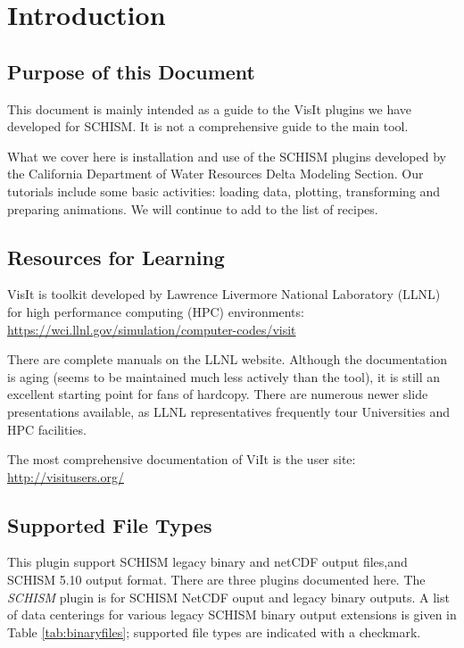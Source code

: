 \documentclass[12pt]{report}
\begin{document}
\lstset{basicstyle=\ttfamily\tiny}

\chapter{Introduction}
\section{Purpose of this Document}
This document is mainly intended as a guide to the VisIt plugins we have developed for SCHISM. 
It is not a comprehensive guide to the main tool.

What we cover here is installation and use of the SCHISM plugins developed by the California Department of Water Resources Delta Modeling Section. Our tutorials include some basic activities: loading data, plotting,
transforming and preparing animations. We will continue to add to the list of recipes. 

\section{Resources for Learning}
VisIt is toolkit developed by Lawrence Livermore National Laboratory (LLNL) for high performance computing (HPC) environments:
\url{https://wci.llnl.gov/simulation/computer-codes/visit}

There are complete manuals on the LLNL website. Although the documentation is aging (seems to be maintained much less actively than the tool), it is still an excellent starting point for fans of hardcopy. There are numerous newer slide presentations available, as LLNL representatives frequently tour Universities and HPC facilities.

The most comprehensive documentation of ViIt is the user site:\\
\url{http://visitusers.org/}

\section{Supported File Types}

This plugin support SCHISM legacy binary and netCDF output files,and SCHISM 5.10 output format. There are three plugins documented here. The \emph{SCHISM} plugin is for SCHISM NetCDF ouput and legacy binary outputs. A list of data centerings for various legacy SCHISM binary output extensions is given in Table \ref{tab:binaryfiles}; supported file types are indicated with a checkmark.
\end{document}
